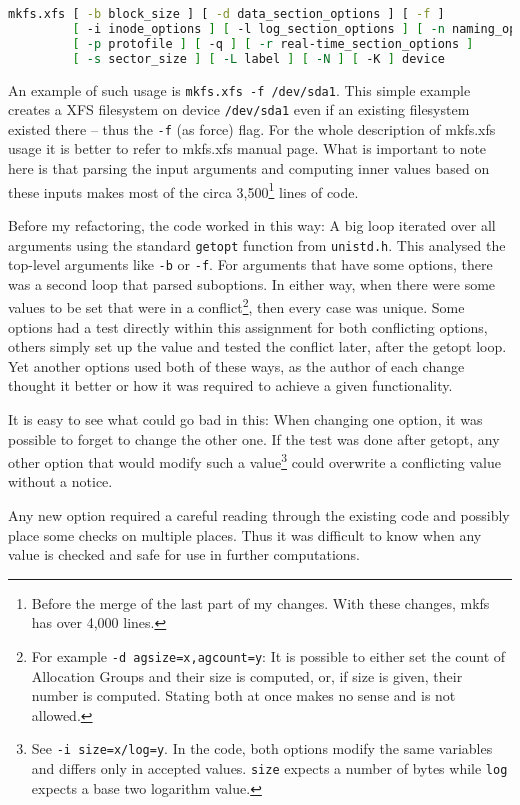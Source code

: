 \begin{lstlisting}[frame=none, basicstyle=\footnotesize\ttfamily, language=Bash, numbers=none, numberstyle=\tiny\color{black},caption= {Synopsis of mkfs.xfs utility~\cite{mkfs.xfsMan}.}]
mkfs.xfs [ -b block_size ] [ -d data_section_options ] [ -f ]
         [ -i inode_options ] [ -l log_section_options ] [ -n naming_options ]
         [ -p protofile ] [ -q ] [ -r real-time_section_options ]
         [ -s sector_size ] [ -L label ] [ -N ] [ -K ] device
\end{lstlisting}

An example of such usage is {\tt mkfs.xfs -f /dev/sda1}. This simple example creates a XFS filesystem on device {\tt /dev/sda1} even if an existing filesystem existed there -- thus the {\tt -f} (as force) flag. For the whole description of mkfs.xfs usage it is better to refer to mkfs.xfs manual page. What is important to note here is that parsing the input arguments and computing inner values based on these inputs makes most of the circa 3,500\footnote{Before the merge of the last part of my changes. With these changes, mkfs has over 4,000 lines.} lines of code.

Before my refactoring, the code worked in this way: A big loop iterated over all arguments using the standard {\tt getopt} function from {\tt unistd.h}. This analysed the top-level arguments like {\tt -b} or {\tt -f}. For arguments that have some options, there was a second loop that parsed suboptions. In either way, when there were some values to be set that were in a conflict\footnote{For example {\tt -d agsize=x,agcount=y}: It is possible to either set the count of Allocation Groups and their size is computed, or, if size is given, their number is computed. Stating both at once makes no sense and is not allowed.}, then every case was unique. Some options had a test directly within this assignment for both conflicting options, others simply set up the value and tested the conflict later, after the getopt loop. Yet another options used both of these ways, as the author of each change thought it better or how it was required to achieve a given functionality.

It is easy to see what could go bad in this: When changing one option, it was possible to forget to change the other one. If the test was done after getopt, any other option that would modify such a value\footnote{See {\tt -i size=x/log=y}. In the code, both options modify the same variables and differs only in accepted values. {\tt size} expects a number of bytes while {\tt log} expects a base two logarithm value.} could overwrite a conflicting value without a notice.

Any new option required a careful reading through the existing code and possibly place some checks on multiple places. Thus it was difficult to know when any value is checked and safe for use in further computations.



